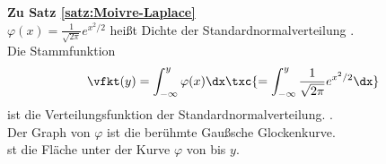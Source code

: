 \begin{bem}
    \textbf{Zu Satz \ref{satz:Moivre-Laplace}}  \\
    $\varphi(x) = \frac{1}{\sqrt{2\pi}} e^{x^2 / 2}$ heißt Dichte der Standardnormalverteilung 
    . \\
    Die Stammfunktion \begin{equation}
                          \vfkt(y) = \int_{- \infty}^y \varphi(x) \dx \txc{ = \int_{- \infty}^y  \frac{1}{\sqrt{2\pi}} e^{x^2 / 2} \dx  }  \label{eq:equation4}
    \end{equation}
    ist die Verteilungsfunktion der Standardnormalverteilung.
     . \\
    Der Graph von $\varphi$ ist die berühmte Gaußsche Glockenkurve. \\
     st die Fläche unter der Kurve $\varphi$ von \ma{- \infty} bis $y$.
\end{bem}


